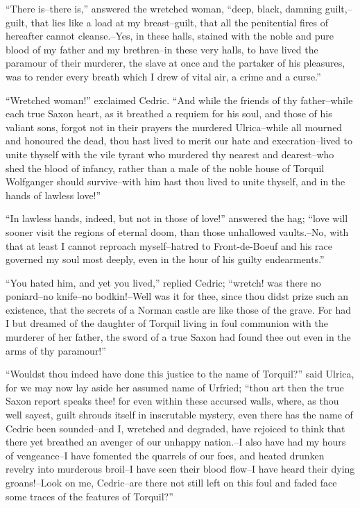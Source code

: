 ``There is--there is,'' answered the wretched woman, ``deep, black,
damning guilt,--guilt, that lies like a load at my breast--guilt, that
all the penitential fires of hereafter cannot cleanse.--Yes, in these
halls, stained with the noble and pure blood of my father and my
brethren--in these very halls, to have lived the paramour of their
murderer, the slave at once and the partaker of his pleasures, was to
render every breath which I drew of vital air, a crime and a curse.''

``Wretched woman!'' exclaimed Cedric. ``And while the friends of thy
father--while each true Saxon heart, as it breathed a requiem for his
soul, and those of his valiant sons, forgot not in their prayers the
murdered Ulrica--while all mourned and honoured the dead, thou hast
lived to merit our hate and execration--lived to unite thyself with the
vile tyrant who murdered thy nearest and dearest--who shed the blood of
infancy, rather than a male of the noble house of Torquil Wolfganger
should survive--with him hast thou lived to unite thyself, and in the
hands of lawless love!''

``In lawless hands, indeed, but not in those of love!'' answered the
hag; ``love will sooner visit the regions of eternal doom, than those
unhallowed vaults.--No, with that at least I cannot reproach
myself--hatred to Front-de-Boeuf and his race governed my soul most
deeply, even in the hour of his guilty endearments.''

``You hated him, and yet you lived,'' replied Cedric; ``wretch! was
there no poniard--no knife--no bodkin!--Well was it for thee, since thou
didst prize such an existence, that the secrets of a Norman castle are
like those of the grave. For had I but dreamed of the daughter of
Torquil living in foul communion with the murderer of her father, the
sword of a true Saxon had found thee out even in the arms of thy
paramour!''

``Wouldst thou indeed have done this justice to the name of Torquil?''
said Ulrica, for we may now lay aside her assumed name of Urfried;
``thou art then the true Saxon report speaks thee! for even within these
accursed walls, where, as thou well sayest, guilt shrouds itself in
inscrutable mystery, even there has the name of Cedric been sounded--and
I, wretched and degraded, have rejoiced to think that there yet breathed
an avenger of our unhappy nation.--I also have had my hours of
vengeance--I have fomented the quarrels of our foes, and heated drunken
revelry into murderous broil--I have seen their blood flow--I have heard
their dying groans!--Look on me, Cedric--are there not still left on
this foul and faded face some traces of the features of Torquil?''

